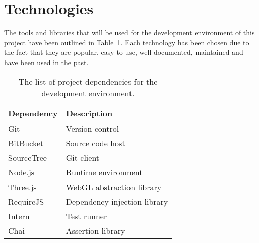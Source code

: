 \section{Technologies} {
\label{sec:technologies}

	The tools and libraries that will be used for the development environment of this project have been outlined in Table~\ref{tab:dependencies}. Each technology has been chosen due to the fact that they are popular, easy to use, well documented, maintained and have been used in the past.

	\begin{table}[H]
	\caption{The list of project dependencies for the development environment.}
	\label{tab:dependencies}
	\begin{tabularx}{\textwidth}{@{}XX@{}}
		\toprule
		\textbf{Dependency} & \textbf{Description} \\
		\midrule
		Git & Version control \\
		BitBucket & Source code host \\
		SourceTree & Git client \\
		Node.js & Runtime environment \\
		Three.js & WebGL abstraction library \\
		RequireJS & Dependency injection library \\
		Intern & Test runner \\
		Chai & Assertion library \\
		\bottomrule
	\end{tabularx}
	\end{table}

}
